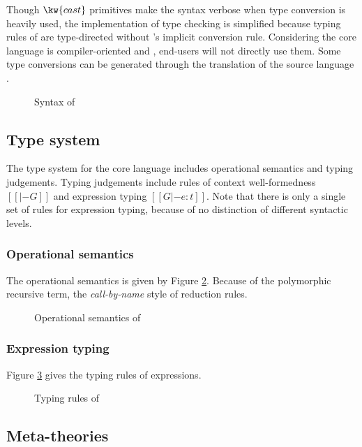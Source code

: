 Though $\kw{cast}$ primitives make the syntax verbose when type conversion is heavily used, the implementation of type checking is simplified because typing rules of \name are type-directed without \cc's implicit conversion rule. Considering the core language is compiler-oriented and , end-users will not directly use them. Some type conversions can be generated through the translation of the source language \fixme{(\S \ref{sec:src})}.

\begin{figure}
    \gram{\otte\ottinterrule
        \ottG\ottinterrule
        \ottv}
    \caption{Syntax of \name}
    \label{fig:core:syntax}
\end{figure}

\subsection{Type system}\label{sec:core:type}
The type system for the core language includes operational semantics and typing judgements. Typing judgements include rules of context well-formedness $[[|- G]]$ and expression typing $[[G |- e : t]]$. Note that there is only a single set of rules for expression typing, because of no distinction of different syntactic levels.

\subsubsection{Operational semantics}
The operational semantics is given by Figure \ref{fig:core:opsem}. Because of the polymorphic recursive term, the \emph{call-by-name}   style of reduction rules.

\begin{figure}
    \ottdefnstep{}
    \caption{Operational semantics of \name}
    \label{fig:core:opsem}
\end{figure}

\subsubsection{Expression typing}
Figure \ref{fig:core:typing} gives the typing rules of expressions. 


\begin{figure}
    \ottdefnctx{}
    \ottdefnexpr{}
    \caption{Typing rules of \name}
    \label{fig:core:typing}
\end{figure}

\subsection{Meta-theories}\label{sec:core:meta}
